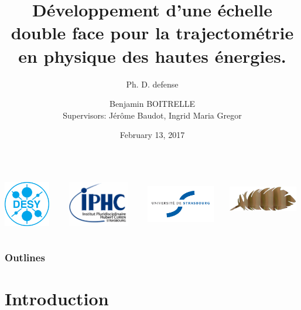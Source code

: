 \documentclass{beamer}
\title[Ph. D. defense]{Développement d'une échelle double face pour la trajectométrie en physique des hautes énergies.}
\subtitle{Ph. D. defense}
\institute{DESY}
\author[Benjamin BOITRELLE]{Benjamin BOITRELLE  \\ Supervisors: Jérôme Baudot, Ingrid Maria Gregor} %
\date{February 13, 2017}
\begin{document}
  \begin{frame}[plain]
    \maketitle
    \begin{columns}[t]
        \begin{column}{2cm}
            \includegraphics[width = 2cm, height = 2cm]{Pictures/DESY-Logo.png}
        \end{column}

        \begin{column}{3cm}
            \includegraphics[width = 3cm, height = 2cm]{Pictures/logo_IPHC_10cm.png}
        \end{column}
        \begin{column}{3cm}
            \includegraphics[width = 3cm, height = 2cm]{Pictures/logo_uni_stra.jpg}
        \end{column}        
        \begin{column}{3cm}
            \includegraphics[width = 3cm, height = 1.5cm]{Pictures/logo_plume.png}
        \end{column}
    \end{columns}

  \end{frame}

  \begin{frame}[plain]
    \frametitle{Outlines}

    \tableofcontents
  \end{frame}

  \section{Introduction}
\end{document}

